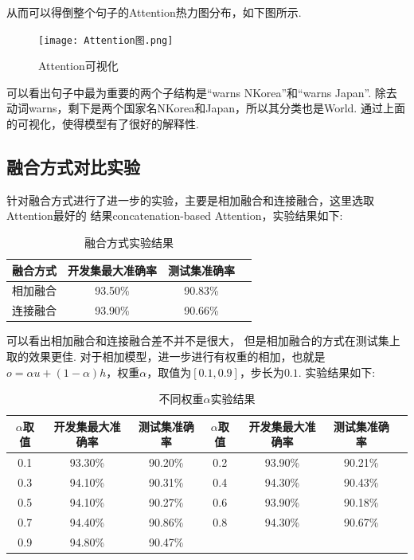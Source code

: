 \documentclass[bachelor,adobefonts]{jnuthesis}
\begin{document}
从而可以得倒整个句子的Attention热力图分布，如下图所示.

\begin{figure}[h!]
  \centering
  \texttt{[image: Attention图.png]}
  \caption{Attention可视化}
\end{figure}

可以看出句子中最为重要的两个子结构是“warns NKorea”和“warns Japan”.
除去动词warns，剩下是两个国家名NKorea和Japan，所以其分类也是World.
通过上面的可视化，使得模型有了很好的解释性.

\subsection{融合方式对比实验}
针对融合方式进行了进一步的实验，主要是相加融合和连接融合，这里选取Attention最好的
结果concatenation-based Attention，实验结果如下:

\begin{table}[h!]
  \centering
  \begin{tabular}{cccc}
    \toprule
    \textbf{融合方式} & \textbf{开发集最大准确率} & \textbf{测试集准确率} \\
    \midrule
    相加融合 & 93.50\% & 90.83\% \\
    连接融合 & 93.90\% & 90.66\% \\
    \bottomrule
  \end{tabular}
  \caption{融合方式实验结果}
\end{table}

可以看出相加融合和连接融合差不并不是很大，
但是相加融合的方式在测试集上取的效果更佳.
对于相加模型，进一步进行有权重的相加，也就是$o = \alpha u + (1-\alpha)h$，权重$\alpha$，取值为$[0.1,0.9]$，步长为$0.1$.
实验结果如下:
\begin{table}[h!]
  \centering
  \begin{tabular}{ccccccc}
    \toprule
    \textbf{$\alpha$取值} & \textbf{开发集最大准确率} & \textbf{测试集准确率} & \textbf{$\alpha$取值} & \textbf{开发集最大准确率} & \textbf{测试集准确率} \\
    \midrule
    0.1 & 93.30\% & 90.20\% & 0.2 & 93.90\% & 90.21\%\\
    0.3 & 94.10\% & 90.31\% & 0.4 & 94.30\% & 90.43\%\\
    0.5 & 94.10\% & 90.27\% & 0.6 & 93.90\% & 90.18\%\\
    0.7 & 94.40\% & 90.86\% & 0.8 & 94.30\% & 90.67\% \\
    0.9 & 94.80\% & 90.47\% &&&\\
    \bottomrule
  \end{tabular}
  \caption{不同权重$\alpha$实验结果}
\end{table}
\end{document}
